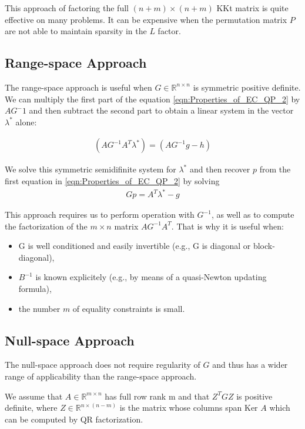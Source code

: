 This approach of factoring  the full $(n+m)\times (n+m)$ KKt matrix is quite effective  on many problems. It can be expensive when the permutation matrix $P$ are not able to maintain sparsity in the $L$ factor.
\subsection*{Range-space Approach}
The range-space approach is useful when $G\in \mathbb{R}^{n\times n}$ is symmetric positive definite. We can multiply the first part of the equation \ref{eqn:Properties_of_EC_QP_2}  by $AG^-1$ and then subtract the second part to obtain a linear system in the vector $\lambda^*$ alone:

\begin{equation}
	\begin{aligned}
		(AG^{-1}A^T\lambda^*) = (AG^{-1}g-h)
	\end{aligned}
	\label{eqn:Range_space_1}
\end{equation}

We solve this symmetric semidifinite system for $\lambda^*$ and then recover $p$ from the first equation in \ref{eqn:Properties_of_EC_QP_2} by solving
\begin{equation}
	\begin{aligned}
		Gp = A^T\lambda^*-g
	\end{aligned}
	\label{eqn:Range_space_2}
\end{equation}

This approach requires us to perform operation with $G^{-1}$, as well as to compute the factorization of the $m\times n$ matrix $AG^{-1}A^T$. That is why it is useful when:
\begin{itemize}
	\item G is well conditioned and easily invertible (e.g., G is diagonal or block-diagonal),
	\item $B^{-1}$ is known explicitely (e.g., by means of a quasi-Newton updating formula),
	\item the number $m$ of equality constraints is small.
\end{itemize}

\subsection*{Null-space Approach}
The null-space approach does not require regularity of $G$ and thus has a wider range of applicability than the range-space approach.

We assume that $A\in \mathbb{R}^{m\times n}$ has full row rank m and that $Z^TGZ$ is positive definite, where $Z\in \mathbb{R}^{n\times (n-m)}$ is the matrix whose columns span Ker $A$ which can be computed by QR factorization.

